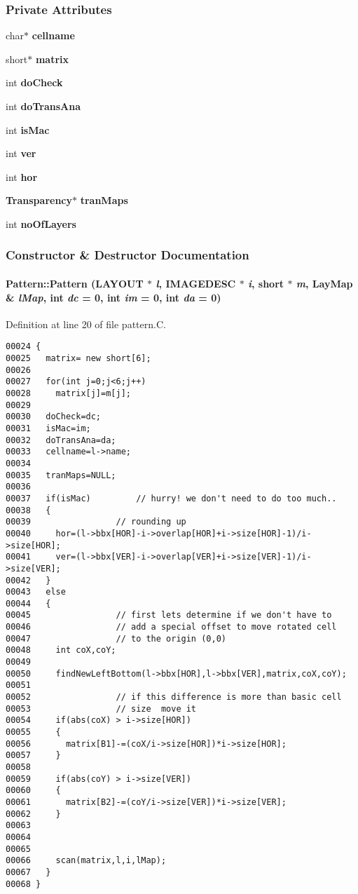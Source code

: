 \subsubsection*{Private Attributes}
\begin{CompactItemize}
\item 
char$\ast$ {\bf cellname}
\item 
short$\ast$ {\bf matrix}
\item 
int {\bf do\-Check}
\item 
int {\bf do\-Trans\-Ana}
\item 
int {\bf is\-Mac}
\item 
int {\bf ver}
\item 
int {\bf hor}
\item 
{\bf Transparency}$\ast$ {\bf tran\-Maps}
\item 
int {\bf no\-Of\-Layers}
\end{CompactItemize}


\subsubsection{Constructor \& Destructor Documentation}
\label{Pattern_a0}
\paragraph{\setlength{\rightskip}{0pt plus 5cm}Pattern::Pattern (LAYOUT $\ast$ {\em l}, {\bf IMAGEDESC} $\ast$ {\em i}, short $\ast$ {\em m}, {\bf Lay\-Map} \& {\em l\-Map}, int {\em dc} = 0, int {\em im} = 0, int {\em da} = 0)}\hfill



Definition at line 20 of file pattern.C.\small\begin{verbatim}00024 {
00025   matrix= new short[6];
00026   
00027   for(int j=0;j<6;j++)
00028     matrix[j]=m[j];
00029 
00030   doCheck=dc;
00031   isMac=im;
00032   doTransAna=da;
00033   cellname=l->name;
00034 
00035   tranMaps=NULL;
00036   
00037   if(isMac)         // hurry! we don't need to do too much..
00038   {
00039                 // rounding up
00040     hor=(l->bbx[HOR]-i->overlap[HOR]+i->size[HOR]-1)/i->size[HOR];
00041     ver=(l->bbx[VER]-i->overlap[VER]+i->size[VER]-1)/i->size[VER];
00042   }
00043   else
00044   {
00045                 // first lets determine if we don't have to 
00046                 // add a special offset to move rotated cell
00047                 // to the origin (0,0) 
00048     int coX,coY;
00049 
00050     findNewLeftBottom(l->bbx[HOR],l->bbx[VER],matrix,coX,coY);
00051     
00052                 // if this difference is more than basic cell
00053                 // size  move it
00054     if(abs(coX) > i->size[HOR])
00055     {
00056       matrix[B1]-=(coX/i->size[HOR])*i->size[HOR];    
00057     }
00058     
00059     if(abs(coY) > i->size[VER])
00060     {
00061       matrix[B2]-=(coY/i->size[VER])*i->size[VER];    
00062     }
00063     
00064     
00065     
00066     scan(matrix,l,i,lMap);
00067   }
00068 }
\end{verbatim}\normalsize 
\label{Pattern_a1}
